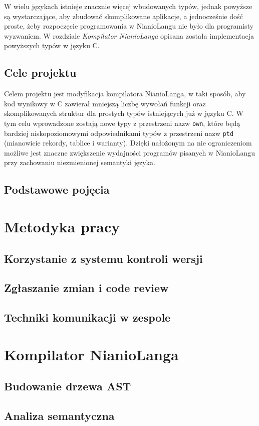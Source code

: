 \documentclass[licencjacka]{pracamgr}
\begin{document}
W wielu językach istnieje znacznie więcej wbudowanych typów, jednak powyższe są wystarczające, aby zbudować skomplikowane aplikacje,
a jednocześnie dość proste, żeby rozpoczęcie programowania w NianioLangu nie było dla programisty wyzwaniem.
W rozdziale \textit{Kompilator NianioLanga} opisana została implementacja powyższych typów w języku C.

\section{Cele projektu}
Celem projektu jest modyfikacja kompilatora NianioLanga, w taki sposób, aby kod wynikowy w C zawierał mniejszą liczbę wywołań funkcji oraz skomplikowanych
struktur dla prostych typów istniejących już w języku C. W tym celu wprowadzone zostają nowe typy z przestrzeni nazw \texttt{own},
które będą bardziej niskopoziomowymi odpowiednikami typów z przestrzeni nazw \texttt{ptd} (mianowicie rekordy, tablice i warianty).
Dzięki nałożonym na nie ograniczeniom możliwe jest znaczne zwiększenie wydajności programów pisanych w NianioLangu przy zachowaniu
niezmienionej semantyki języka.
\section{Podstawowe pojęcia}
\chapter{Metodyka pracy}
\section{Korzystanie z systemu kontroli wersji}
\section{Zgłaszanie zmian i code review}
\section{Techniki komunikacji w zespole}

\chapter{Kompilator NianioLanga}
\section{Budowanie drzewa AST}
\section{Analiza semantyczna}
\end{document}
